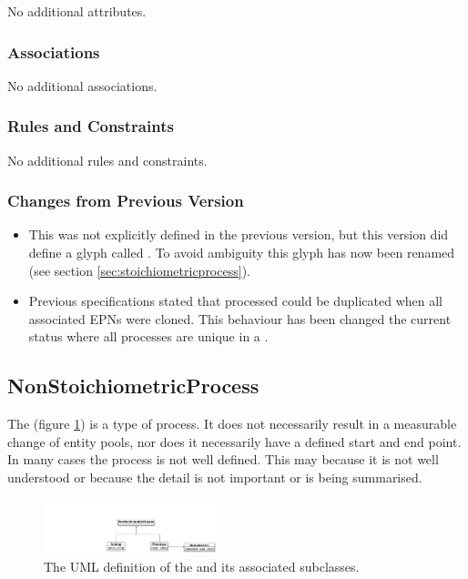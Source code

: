 No additional attributes.

\subsubsection{Associations}

No additional associations.

\subsubsection{Rules and Constraints}

No additional rules and constraints.

\subsubsection{Changes from Previous Version}
\begin{itemize}
\item This was not explicitly defined in the previous version, but
  this version did define a glyph called . To avoid
  ambiguity this glyph has now been renamed  (see section \ref{sec:stoichiometricprocess}).
\item Previous specifications stated that processed could be
  duplicated when all associated EPNs were cloned. This behaviour has
  been changed the current status where all processes are unique in a \PDm.
\end{itemize}

\subsection{NonStoichiometricProcess}
\label{defn:NonStoichiometricProcess}

The  (figure \ref{fig:nonstoichprocessuml})
is a type of process. It does not necessarily result in a measurable
change of entity pools, nor does it necessarily have a defined start
and end point. In many cases the process is not well defined. This may
because it is not well understood or because the detail is not
important or is being summarised.

\begin{figure}[htb]
  \centering
  \includegraphics[width = 0.45\textwidth]{images/nonstoichprocessuml}
  \caption{The UML definition of the  and its
    associated subclasses.}
  \label{fig:nonstoichprocessuml}
\end{figure}

